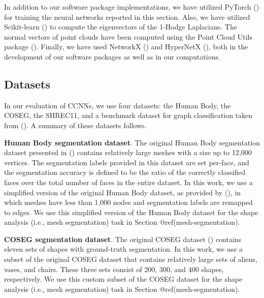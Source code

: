 \documentclass[
  12pt,
]{krantz}
\begin{document}
In addition to our software package implementations, we have utilized
PyTorch () for
training the neural networks reported in this section. Also, we have
utilized Scikit-learn () to compute the eigenvectors of the 1-Hodge Laplacians. The normal
vectors of point clouds have been computed using the Point Cloud Utils
package (). Finally, we
have used NetworkX () and HyperNetX
(), both in the
development of our software packages as well as in our computations.

\subsection{Datasets}\label{datasets}

In our evaluation of CCNNs, we use four datasets: the Human Body, the
COSEG, the SHREC11, and a benchmark dataset for graph classification
taken from (). A summary of these datasets follows.

\textbf{Human Body segmentation dataset}. The original Human Body
segmentation dataset presented in
()
contains relatively large meshes with a size up to 12,000 vertices. The
segmentation labels provided in this dataset are set per-face, and the
segmentation accuracy is defined to be the ratio of the correctly
classified faces over the total number of faces in the entire dataset.
In this work, we use a simplified version of the original Human Body
dataset, as provided by (), in which meshes have less than 1,000 nodes and segmentation
labels are remapped to edges. We use this simplified version of the
Human Body dataset for the shape analysis (i.e., mesh segmentation) task
in Section @ref(mesh-segmentation).

\textbf{COSEG segmentation dataset}. The original COSEG dataset
() contains eleven
sets of shapes with ground-truth segmentation. In this work, we use a
subset of the original COSEG dataset that contains relatively large sets
of aliens, vases, and chairs. These three sets consist of 200, 300, and
400 shapes, respectively. We use this custom subset of the COSEG dataset
for the shape analysis (i.e., mesh segmentation) task in Section
@ref(mesh-segmentation).
\end{document}
